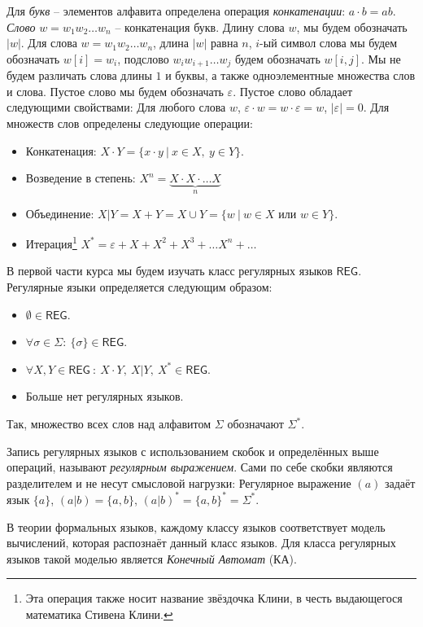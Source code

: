 \documentclass[12pt]{article}
\theoremstyle{definiton}
\theoremstyle{definition}
\let\eps\varepsilon
\def\REG{{\mathsf{REG}}}
\begin{document}
	Для \emph{букв} -- элементов алфавита определена операция \emph{конкатенации}: $a\cdot b = ab$.
	\emph{Слово} $w = w_1w_2\ldots w_n$ -- конкатенация букв. Длину слова $w$, мы будем обозначать $|w|$.
	Для слова $w = w_1w_2\ldots w_n$, длина $|w|$ равна $n$, $i$-ый символ слова мы будем обозначать $w[i] = w_i$,
	подслово $w_iw_{i+1}\ldots w_j$ будем обозначать $w[i,j]$. Мы не будем различать слова длины $1$ и буквы, а также
	одноэлементные множества слов и слова. Пустое слово мы будем обозначать $\eps$. Пустое слово обладает следующими свойствами:
	Для любого слова $w$, $\eps\cdot w = w \cdot \eps = w$, $|\eps| = 0$.   
	Для множеств слов определены следующие операции:

	\begin{itemize}
		\item Конкатенация: $X\cdot Y = \{ x\cdot y\ |\ x \in X,\ y \in Y  \}$.
		\item Возведение в степень: $X^n = \underbrace{X\cdot X\cdot\ldots X}_{n}$
		\item Объединение: $X | Y = X + Y = X \cup Y = \{ w\ |\ w \in X $ или $ w \in Y\} $.
		\item Итерация\footnote{Эта операция также носит название звёздочка Клини, в честь выдающегося математика Стивена Клини.} $X^* = \eps + X + X^2 + X^3 + \ldots X^n + \ldots$
	\end{itemize}

	В первой части курса мы будем изучать класс регулярных языков $\REG$. Регулярные языки определяется следующим образом:

	\begin{itemize}
		\item $\emptyset \in \REG$.
		\item $\forall \sigma \in \Sigma:\ \{ \sigma \} \in \REG $.
		\item $\forall X, Y \in \REG\ :\ X\cdot Y,\ X|Y,\ X^* \in \REG   $.
		\item Больше нет регулярных языков.
	\end{itemize}

	Так, множество всех слов над алфавитом $\Sigma$ обозначают $\Sigma^*$.


	Запись регулярных языков с использованием скобок и определённых выше операций, называют \emph{регулярным выражением}.
	Сами по себе скобки являются разделителем и не несут смысловой нагрузки: 
	Регулярное выражение $(a) $  задаёт язык $\{a\}$, $(a|b) = \{a,b\}$, $(a|b)^* = \{a,b\}^* = \Sigma^*$.

	В теории формальных языков, каждому классу языков соответствует модель вычислений, которая распознаёт данный класс языков. Для класса регулярных языков такой моделью является \emph{Конечный Автомат} (КА).
\end{document}
